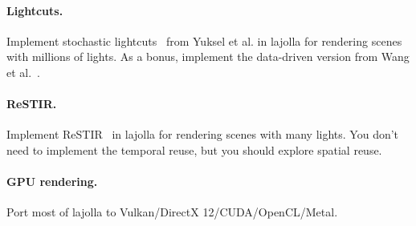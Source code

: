 \paragraph{Lightcuts.}
Implement stochastic lightcuts~\cite{Yuksel:2019:SL} from Yuksel et al. in lajolla for rendering scenes with millions of lights.
As a bonus, implement the data-driven version from Wang et al.~\cite{Wang:2021:LCR}.

\paragraph{ReSTIR.}
Implement ReSTIR~\cite{Bitterli:2020:SRR} in lajolla for rendering scenes with many lights.
You don't need to implement the temporal reuse, but you should explore spatial reuse.

\paragraph{GPU rendering.}
Port most of lajolla to Vulkan/DirectX 12/CUDA/OpenCL/Metal.





